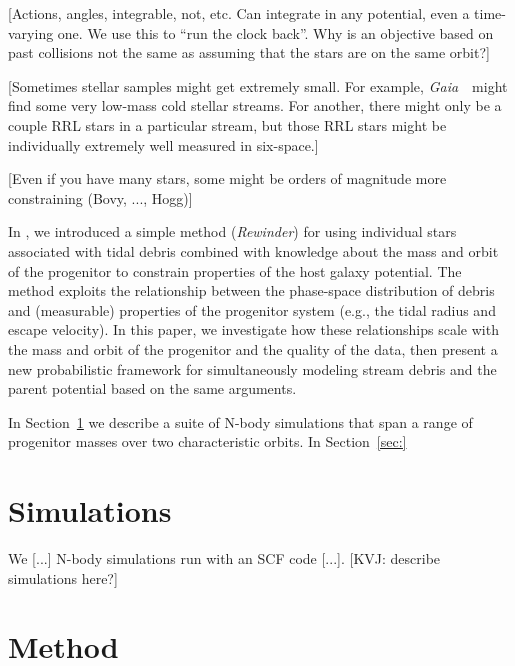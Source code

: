 \documentclass[letterpaper,12pt,preprint]{aastex}
\newcommand{\project}[1]{\textsl{#1}}
\newcommand{\gaia}{\project{Gaia}~}
\newcommand{\paperone}{Paper 1}
\begin{document}
[Actions, angles, integrable, not, etc.  Can integrate in any
  potential, even a time-varying one. We use this to
  ``run the clock back''.  Why is an objective based on past collisions not the
  same as assuming that the stars are on the same orbit?]

[Sometimes stellar samples might get extremely small.  For example,
  \gaia\ might find some very low-mass cold stellar streams.  For
  another, there might only be a couple RRL stars in a particular
  stream, but those RRL stars might be individually extremely well
  measured in six-space.]

[Even if you have many stars, some might be orders of magnitude more constraining (Bovy, ..., Hogg)]

In \citet[][hereafter \paperone]{apw13}, we introduced a simple method (\emph{Rewinder}) for using individual stars associated with tidal debris combined with knowledge about the mass and orbit of the progenitor to constrain properties of the host galaxy potential. The method exploits the relationship between the phase-space distribution of debris and (measurable) properties of the progenitor system (e.g., the tidal radius and escape velocity). In this paper, we investigate how these relationships scale with the mass and orbit of the progenitor and the quality of the data, then present a new probabilistic framework for simultaneously modeling stream debris and the parent potential based on the same arguments.

In Section~\ref{sec:sims} we describe a suite of N-body simulations that span a range of progenitor masses over two characteristic orbits. In Section~\ref{sec:}

\section{Simulations}\label{sec:sims}

We [...] N-body simulations run with an SCF code [...]. [KVJ: describe simulations here?]

\section{Method}
\end{document}
